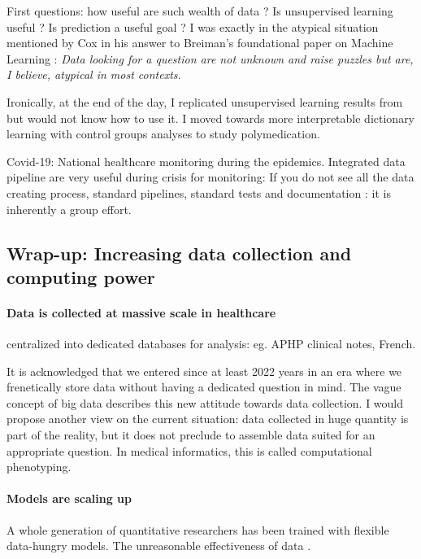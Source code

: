 \documentclass[french,12pt,twoside,a4paper]{book}
\begin{document}
First questions: how useful are such wealth of data ? Is unsupervised learning
useful ? Is prediction a useful goal ? I was exactly in the atypical situation
mentioned by Cox in his answer to Breiman's foundational paper on Machine
Learning \citep{breiman2001statistical} : \textit{Data looking for a question are
  not unknown and raise puzzles but are, I believe, atypical in most contexts.}

Ironically, at the end of the day, I
replicated unsupervised learning results from \citep{beam2019clinical} but would
not know how to use it. I moved towards more interpretable dictionary learning
with control groups analyses to study polymedication.

Covid-19: National healthcare monitoring during the epidemics. Integrated data
pipeline are very useful during crisis for monitoring: If you do not see all the
data creating process, standard pipelines, standard tests and documentation : it
is inherently a group effort.

\subsection{Wrap-up: Increasing data collection and computing power}\label{subsec:intro:wrapup}

\paragraph{Data is collected at massive scale in healthcare} centralized
into dedicated databases for analysis: eg. APHP clinical notes, French.

It is acknowledged that we entered since at least 2022 years in an era where we
frenetically store data without having a dedicated question in mind. The vague
concept of big data describes this new attitude towards data collection. I would
propose another view on the current situation: data collected in huge quantity
is part of the reality, but it does not preclude to assemble data suited for an
appropriate question. In medical informatics, this is called computational
phenotyping.

\paragraph{Models are scaling up}
A whole generation of quantitative researchers has been trained with flexible
data-hungry models. The unreasonable effectiveness of data \citep{halevy2009unreasonable}.
\end{document}

